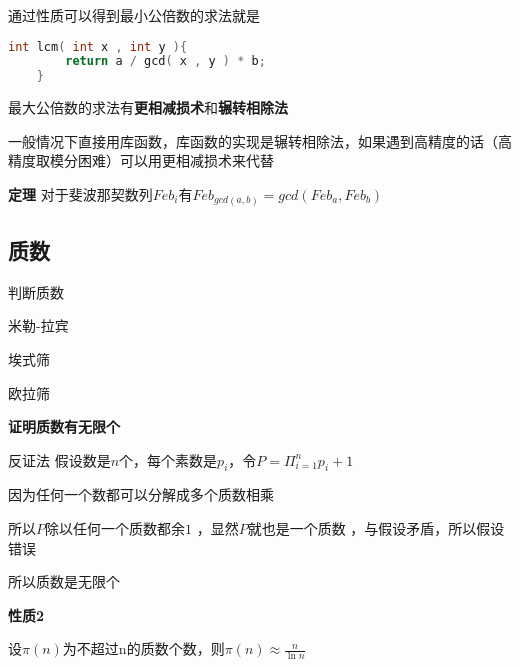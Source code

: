 通过性质可以得到最小公倍数的求法就是
\begin{lstlisting}[language = c]
    int lcm( int x , int y ){
        return a / gcd( x , y ) * b;
    }
\end{lstlisting}
最大公倍数的求法有\textbf{更相减损术}和\textbf{辗转相除法}



一般情况下直接用库函数，库函数的实现是辗转相除法，如果遇到高精度的话（高精度取模分困难）可以用更相减损术来代替

\textbf{定理} 对于斐波那契数列$Feb_i$有$Feb_{gcd(a,b)}=gcd(Feb_a , Feb_b)$

\subsection{质数}
判断质数


米勒-拉宾



埃式筛

欧拉筛


\textbf{证明质数有无限个}

反证法 假设数是$n$个，每个素数是$p_i$，令$P = \Pi_{i=1}^{n} p_i + 1$

因为任何一个数都可以分解成多个质数相乘

所以$P$除以任何一个质数都余$1$ ，显然$P$就也是一个质数 ，与假设矛盾，所以假设错误

所以质数是无限个

\textbf{性质2}

设$\pi(n)$为不超过n的质数个数，则$\pi(n) \approx \frac{n}{\ln{n}}$





